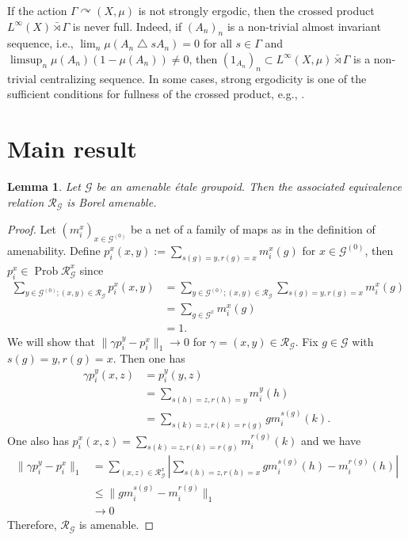 \documentclass{amsart}
\newcommand{\G}{\mathcal{G}}
\newcommand{\R}{\mathcal{R}}
\newcommand{\Prob}[1]{\operatorname{Prob}{#1}}
\newtheorem{lemma}[theorem]{Lemma}
\theoremstyle{remark}
\theoremstyle{definition}
\begin{document}
If the action $\Gamma \curvearrowright (X, \mu)$ is not strongly ergodic, then the crossed product $L^{\infty} (X) \bar{\rtimes} \Gamma$ is never full.
Indeed, if $(A_n)_n$ is a non-trivial almost invariant sequence, i.e., $\lim _n \mu (A_n \bigtriangleup s A_n) = 0$ for all $s \in \Gamma$ and $\limsup_n \mu (A_n) (1- \mu (A_n)) \neq 0$, then $(1_{A_n})_n \subset L^{\infty}(X, \mu) \bar{\rtimes} \Gamma$ is a non-trivial centralizing sequence.
In some cases, strong ergodicity is one of the sufficient conditions for fullness of the crossed product, e.g., \cite{Choda, HoudayerIsono}.

\section{Main result}
\begin{lemma}\label{Lemma}
Let $\G$ be an amenable \'etale groupoid.
Then the associated equivalence relation $\R _\G$ is Borel amenable.
\end{lemma}

\begin{proof}
Let $(m_i^x)_{x \in \G^{(0)}}$ be a net of a family of maps as in the definition of amenability.
Define $\displaystyle p_i^x (x, y) := \sum _{s(g)=y, r(g)=x} m_i^x(g)$ for $x \in \G^{(0)}$, then $p_i^x \in \Prob \R_\G^x$ since
\begin{align*}
\sum_{y \in \G^{(0)}; (x, y) \in \R _\G} p_i^x (x, y) &= \sum _{y \in \G^{(0)}; (x, y) \in \R _\G} \sum_{s(g)=y, r(g)=x} m_i^x(g) \\
&= \sum _{g \in \G ^x} m_i^x (g) \\
&=1.
\end{align*}
We will show that $\| \gamma p_i^y - p_i^x \|_1 \to 0$ for $\gamma = (x, y) \in \R_\G$.
Fix $g \in \G$ with $s(g) = y, r(g) = x$.
Then one has
\begin{align*}
\gamma p_i^y (x, z) &= p_i^y (y, z) \\
&= \sum_{s(h)=z, r(h)=y} m_i^y(h) \\
&= \sum_{s(k)=z, r(k)=r(g)} gm_i^{s(g)}(k).
\end{align*}
One also has $\displaystyle p_i^x(x,z) = \sum_{s(k)=z, r(k)=r(g)} m_i^{r(g)}(k)$ and we have
\begin{align*}
\| \gamma p_i^y - p_i^x \|_1 &= \sum_{(x, z) \in \R_\G^x} \left| \sum_{s(h)=z, r(h)=x} gm_i^{s(g)}(h) - m_i^{r(g)}(h) \right| \\
& \leq \| gm_i^{s(g)} - m_i^{r(g)} \|_1 \\
&\to 0
\end{align*}
Therefore, $\R_\G$ is amenable.
\end{proof}
\end{document}
